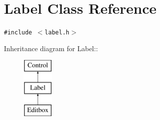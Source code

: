 \hypertarget{class_label}{
\section{Label Class Reference}
\label{class_label}
}
{\tt \#include $<$label.h$>$}

Inheritance diagram for Label::\begin{figure}[H]
\begin{center}
\leavevmode
\includegraphics[height=3cm]{class_label}
\end{center}
\end{figure}
